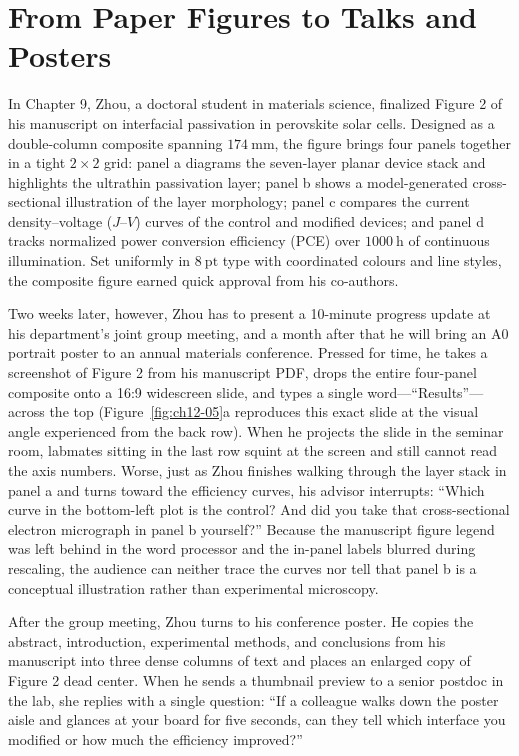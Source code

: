 \chapter{From Paper Figures to Talks and Posters}

In Chapter 9, Zhou, a doctoral student in materials science, finalized Figure 2 of his manuscript on interfacial passivation in perovskite solar cells. Designed as a double-column composite spanning $174\ \text{mm}$, the figure brings four panels together in a tight $2 \times 2$ grid: panel a diagrams the seven-layer planar device stack and highlights the ultrathin passivation layer; panel b shows a model-generated cross-sectional illustration of the layer morphology; panel c compares the current density--voltage ($J\text{--}V$) curves of the control and modified devices; and panel d tracks normalized power conversion efficiency (PCE) over $1000\ \text{h}$ of continuous illumination. Set uniformly in $8\ \text{pt}$ type with coordinated colours and line styles, the composite figure earned quick approval from his co-authors.

Two weeks later, however, Zhou has to present a 10-minute progress update at his department's joint group meeting, and a month after that he will bring an A0 portrait poster to an annual materials conference. Pressed for time, he takes a screenshot of Figure 2 from his manuscript PDF, drops the entire four-panel composite onto a 16:9 widescreen slide, and types a single word---``Results''---across the top (Figure~\ref{fig:ch12-05}a reproduces this exact slide at the visual angle experienced from the back row). When he projects the slide in the seminar room, labmates sitting in the last row squint at the screen and still cannot read the axis numbers. Worse, just as Zhou finishes walking through the layer stack in panel a and turns toward the efficiency curves, his advisor interrupts: ``Which curve in the bottom-left plot is the control? And did you take that cross-sectional electron micrograph in panel b yourself?'' Because the manuscript figure legend was left behind in the word processor and the in-panel labels blurred during rescaling, the audience can neither trace the curves nor tell that panel b is a conceptual illustration rather than experimental microscopy.

After the group meeting, Zhou turns to his conference poster. He copies the abstract, introduction, experimental methods, and conclusions from his manuscript into three dense columns of text and places an enlarged copy of Figure 2 dead center. When he sends a thumbnail preview to a senior postdoc in the lab, she replies with a single question: ``If a colleague walks down the poster aisle and glances at your board for five seconds, can they tell which interface you modified or how much the efficiency improved?''

